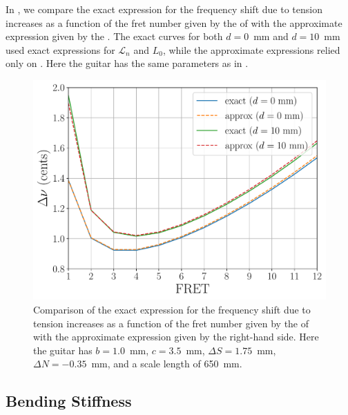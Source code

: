 In , we compare the exact expression for the frequency shift due to tension increases as a function of the fret number given by the \lhs of  with the approximate expression given by the \rhs. The exact curves for both $d = 0$~mm and $d = 10$~mm used exact expressions for $\mathcal{L}_n$ and $L_0$, while the approximate expressions relied only on . Here the guitar has the same parameters as in .

\begin{figure}
  \centering
  \includegraphics[width=5.0in]{../figures/tn_test}
  \caption{\label{fig:tn_test} Comparison of the exact expression for the frequency shift due to tension increases as a function of the fret number given by the \lhs of  with the approximate expression given by the right-hand side. Here the guitar has $b = 1.0$~mm, $c = 3.5$~mm, $\Delta S = 1.75$~mm, $\Delta N = -0.35$~mm, and a scale length of 650~mm.}
\end{figure}


\subsection{Bending Stiffness}

